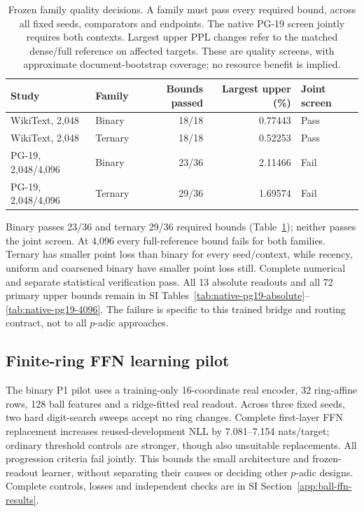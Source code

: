 \documentclass[11pt]{article}
\begin{document}
\begin{table}[htbp]
\centering\small
\caption{Frozen family quality decisions. A family must pass every required
bound, across all fixed seeds, comparators and endpoints. The native PG-19
screen jointly requires both contexts. Largest upper PPL changes refer to the
matched dense/full reference on affected targets. These are quality screens,
with approximate document-bootstrap coverage; no resource benefit is implied.}
\label{tab:central-quality}
\begin{tabular}{llrrl}
\toprule
Study & Family & Bounds passed & Largest upper (\%) & Joint screen\\
\midrule
WikiText, 2,048 & Binary & 18/18 & 0.77443 & Pass\\
WikiText, 2,048 & Ternary & 18/18 & 0.52253 & Pass\\
PG-19, 2,048/4,096 & Binary & 23/36 & 2.11466 & Fail\\
PG-19, 2,048/4,096 & Ternary & 29/36 & 1.69574 & Fail\\
\bottomrule
\end{tabular}
\end{table}

Binary passes 23/36 and ternary 29/36 required bounds
(Table~\ref{tab:central-quality}); neither passes the joint screen.
At 4,096 every full-reference bound fails for both families. Ternary has
smaller point loss than binary for every seed/context, while recency, uniform
and coarsened binary have smaller point loss still. Complete numerical and
separate statistical verification pass. All 13 absolute readouts
and all 72 primary upper bounds remain in SI
Tables~\ref{tab:native-pg19-absolute}--\ref{tab:native-pg19-4096}.
The failure is specific to this trained bridge and routing contract, not to
all \(p\)-adic approaches.

\subsection{Finite-ring FFN learning pilot}

The binary P1 pilot uses a training-only 16-coordinate real encoder,
32 ring-affine rows, 128 ball features and a ridge-fitted real readout.
Across three fixed seeds, two hard digit-search sweeps accept no ring changes.
Complete first-layer FFN replacement increases reused-development NLL by
7.081--7.154 nats/target; ordinary threshold controls are stronger, though
also unsuitable replacements. All progression criteria fail jointly.
This bounds the small architecture and frozen-readout learner, without
separating their causes or deciding other \(p\)-adic designs. Complete controls,
losses and independent checks are in SI Section~\ref{app:ball-ffn-results}.
\end{document}
